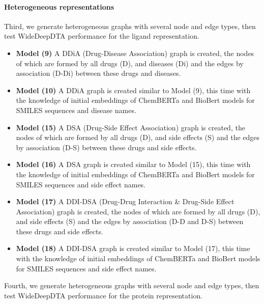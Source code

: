 \paragraph{Heterogeneous representations}
Third, we generate heterogeneous graphs with several node and edge types, then test WideDeepDTA performance for the ligand representation.

\begin{itemize}
    \item \textbf{Model (9)} A DDiA (Drug-Disease Association) graph is created, the nodes of which are formed by all drugs (D), and diseases (Di) and the edges by association (D-Di) between these drugs and diseases.  
    \item \textbf{Model (10)} A DDiA graph is created similar to Model (9), this time with the knowledge of initial embeddings of ChemBERTa and BioBert models for SMILES sequences and disease names.
    \item \textbf{Model (15)} A DSA (Drug-Side Effect Association) graph is created, the nodes of which are formed by all drugs (D), and side effects (S) and the edges by association (D-S) between these drugs and side effects.  
    \item \textbf{Model (16)} A DSA graph is created similar to Model (15), this time with the knowledge of initial embeddings of ChemBERTa and BioBert models for SMILES sequences and side effect names.
    \item \textbf{Model (17)} A DDI-DSA (Drug-Drug Interaction \& Drug-Side Effect Association) graph is created, the nodes of which are formed by all drugs (D), and side effects (S) and the edges by association (D-D and D-S) between these drugs and side effects.  
    \item \textbf{Model (18)} A DDI-DSA graph is created similar to Model (17), this time with the knowledge of initial embeddings of ChemBERTa and BioBert models for SMILES sequences and side effect names.
\end{itemize}








Fourth, we generate heterogeneous graphs with several node and edge types, then test WideDeepDTA performance for the protein representation.

